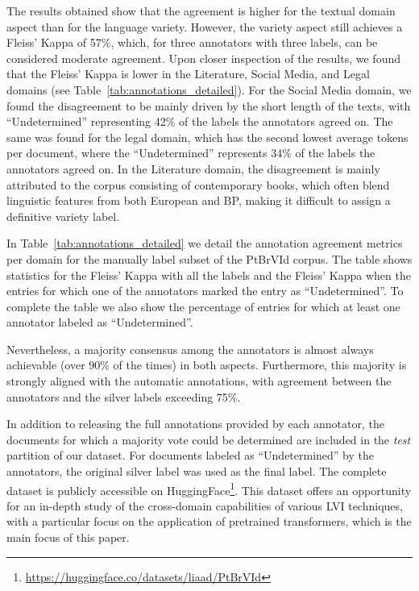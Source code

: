 


The results obtained show that the agreement is higher for the textual domain aspect than for the language variety. However, the variety aspect still achieves a Fleiss' Kappa of 57\%, which, for three annotators with three labels, can be considered moderate agreement. Upon closer inspection of the results, we found that the Fleiss' Kappa is lower in the Literature, Social Media, and Legal domains (see Table~\ref{tab:annotations_detailed}). For the Social Media domain, we found the disagreement to be mainly driven by the short length of the texts, with ``Undetermined'' representing 42\% of the labels the annotators agreed on. The same was found for the legal domain, which has the second lowest average tokens per document, where the ``Undetermined'' represents 34\% of the labels the annotators agreed on. In the Literature domain, the disagreement is mainly attributed to the corpus consisting of contemporary books, which often blend linguistic features from both European and BP, making it difficult to assign a definitive variety label.

In Table~\ref{tab:annotations_detailed} we detail the annotation agreement metrics per domain for the manually label subset of the PtBrVId corpus. The table shows statistics for the Fleiss' Kappa with all the labels and the Fleiss' Kappa when the entries for which one of the annotators marked the entry as ``Undetermined''. To complete the table we also show the percentage of entries for which at least one annotator labeled as ``Undetermined''.  



Nevertheless, a majority consensus among the annotators is almost always achievable (over 90\% of the times) in both aspects. Furthermore, this majority is strongly aligned with the automatic annotations, with agreement between the annotators and the silver labels exceeding 75\%.

In addition to releasing the full annotations provided by each annotator, the documents for which a majority vote could be determined are included in the \textit{test} partition of our dataset. For documents labeled as ``Undetermined'' by the annotators, the original silver label was used as the final label. The complete dataset is publicly accessible on HuggingFace\footnote{\url{https://huggingface.co/datasets/liaad/PtBrVId}}. This dataset offers an opportunity for an in-depth study of the cross-domain capabilities of various LVI techniques, with a particular focus on the application of pretrained transformers, which is the main focus of this paper.

